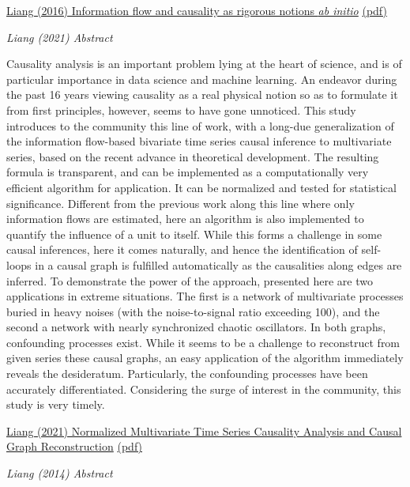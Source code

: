 \documentclass[
]{book}
\begin{document}
\href{https://journals.aps.org/pre/abstract/10.1103/PhysRevE.94.052201}{Liang (2016) Information flow and causality as rigorous notions \emph{ab initio}}
\href{pdf/Liang_2016_Information_Flow_Causality.pdf}{(pdf)}

\emph{Liang (2021) Abstract}

Causality analysis is an important problem lying at the heart of science, and is of particular
importance in data science and machine learning. An endeavor during the past 16 years viewing
causality as a real physical notion so as to formulate it from first principles, however, seems to
have gone unnoticed. This study introduces to the community this line of work, with a long-due
generalization of the information flow-based bivariate time series causal inference to multivariate
series, based on the recent advance in theoretical development. The resulting formula is transparent,
and can be implemented as a computationally very efficient algorithm for application. It can be
normalized and tested for statistical significance. Different from the previous work along this line
where only information flows are estimated, here an algorithm is also implemented to quantify the
influence of a unit to itself. While this forms a challenge in some causal inferences, here it comes
naturally, and hence the identification of self-loops in a causal graph is fulfilled automatically as the
causalities along edges are inferred. To demonstrate the power of the approach, presented here are
two applications in extreme situations. The first is a network of multivariate processes buried in
heavy noises (with the noise-to-signal ratio exceeding 100), and the second a network with nearly
synchronized chaotic oscillators. In both graphs, confounding processes exist. While it seems to be a
challenge to reconstruct from given series these causal graphs, an easy application of the algorithm
immediately reveals the desideratum. Particularly, the confounding processes have been accurately
differentiated. Considering the surge of interest in the community, this study is very timely.

\href{https://www.mdpi.com/1099-4300/23/6/679}{Liang (2021) Normalized Multivariate Time Series Causality Analysis and Causal Graph Reconstruction}
\href{pdf/Liang_2021_Time_Series_Causality.pdf}{(pdf)}

\emph{Liang (2014) Abstract}
\end{document}
